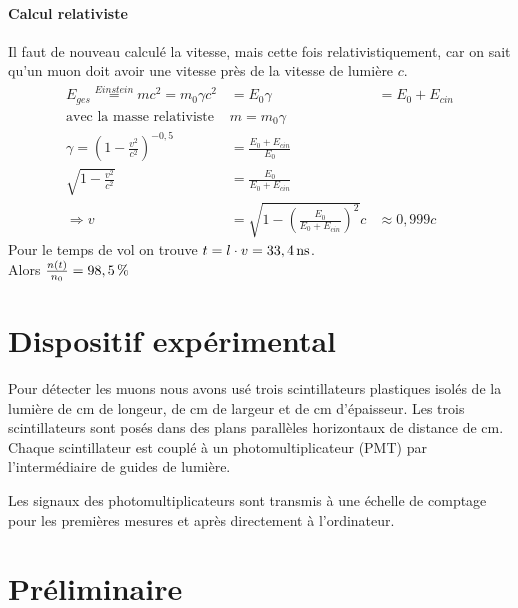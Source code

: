 \documentclass[a4paper,11pt,liststotocnumbered,bibtotocnumbered]{scrartcl}
\begin{document}
   \paragraph{Calcul relativiste}
   Il faut de nouveau calculé la vitesse, mais cette fois relativistiquement, car on sait qu'un muon doit avoir une vitesse près de la vitesse de lumière $c$. 
   \begin{eqnarray*}
    E_{ges}\stackrel{Einstein}{=}mc^2=m_0\gamma c^2&=E_0\gamma &=E_0+E_{cin}\\
    \text{avec la masse relativiste }&m=m_0\gamma&\\
    \gamma=\left(1-\frac{v^2}{c^2}\right)^{-0,5}&=\frac{E_0+E_{cin}}{E_0}&\\
    \sqrt{1-\frac{v^2}{c^2}}&=\frac{E_0}{E_0+E_{cin}}&\\
    \Rightarrow v&=\sqrt{1-\left(\frac{E_0}{E_0+E_{cin}}\right)^2}c&\approx 0,999c
   \end{eqnarray*}
   Pour le temps de vol on trouve $t=l\cdot v=\unit[33,4]{ns}$.\\
   Alors $\frac{n(t)}{n_0}=\unit[98,5]{\%}$
 
 \section{Dispositif expérimental}
  Pour détecter les muons nous avons usé trois scintillateurs plastiques isolés de la lumière de \unit[100]{cm} de longeur, de \unit[20]{cm} de largeur et de \unit[0,8]{cm} d'épaisseur. Les trois scintillateurs sont posés dans des plans parallèles horizontaux de distance de \unit[20]{cm}. Chaque scintillateur est couplé à un photomultiplicateur (PMT) par l'intermédiaire de guides de lumière. 

  Les signaux des photomultiplicateurs sont transmis à une échelle de comptage pour les premières mesures et après directement à l'ordinateur.
  
 \section{Préliminaire}
\end{document}
